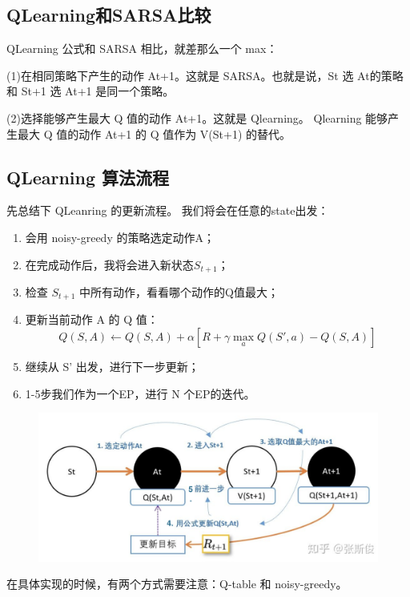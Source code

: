 \documentclass[12pt]{article}
\begin{document}
\subsection{QLearning和SARSA比较}
QLearning 公式和 SARSA 相比，就差那么一个 max：

(1)在相同策略下产生的动作 At+1。这就是 SARSA。也就是说，St 选 At的策略和 St+1 选 At+1 是同一个策略。

(2)选择能够产生最大 Q 值的动作 At+1。这就是 Qlearning。 Qlearning  能够产生最大 Q 值的动作 At+1 的 Q 值作为 V(St+1) 的替代。

\subsection{QLearning 算法流程\cite{Implement_QLearning}}
先总结下 QLeanring 的更新流程。 我们将会在任意的state出发：
\begin{enumerate}
\setlength{\itemsep}{0pt}
\setlength{\parsep}{0pt}
\setlength{\parskip}{0pt}
    \item 会用 noisy-greedy 的策略选定动作A；
    \item 在完成动作后，我将会进入新状态$S_{t+1}$；
    \item 检查 $S_{t+1}$ 中所有动作，看看哪个动作的Q值最大；
    \item 更新当前动作 A 的 Q 值：
    $$
    Q(S,A) \leftarrow Q(S,A) + \alpha [R + \gamma \max_aQ(S', a) - Q(S,A)]
    $$
    \item 继续从 S' 出发，进行下一步更新；
    \item 1-5步我们作为一个EP，进行 N 个EP的迭代。
\end{enumerate}

\begin{figure}[H]
    \centering
    \includegraphics[width=.8\textwidth]{fig/ReinforcementLearning/RL_QLearning_EP.png}
\end{figure}

在具体实现的时候，有两个方式需要注意：Q-table 和 noisy-greedy。
\end{document}
